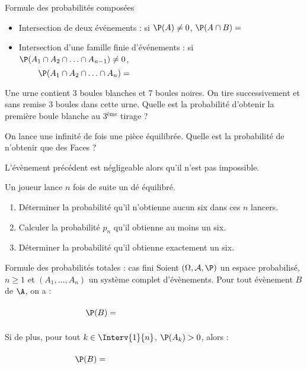 \documentclass[a4paper,10pt]{report}
\begin{document}
\begin{itemize}
\begin{Theoreme}{Formule des probabilités composées}
 \begin{itemize}
  \item Intersection de deux événements : si $\P(A) \ne 0$, $\P(A\cap B) = $
  \item Intersection d'une famille finie d'événements : si $\P(A_1 \cap A_2 \cap \ldots \cap A_{n-1}) \neq 0$,
   $$\P(A_1 \cap A_2 \cap \ldots \cap A_n)= \qquad \qquad \qquad \phantom{ahahaaaaaaaaaaaa bla bla bla}$$
 \end{itemize}
\end{Theoreme}

\begin{Exemple} Une urne contient 3 boules blanches et 7 boules noires. On tire successivement et sans remise 3 boules dans cette urne. Quelle est la probabilité d'obtenir la première boule blanche au 3$^{\text{ème}}$ tirage ?

\vspace{4cm}
\end{Exemple}


\begin{Exemple} On lance une infinité de fois une pièce équilibrée. Quelle est la probabilité de n'obtenir que des Faces ?

\vspace{5cm}
\end{Exemple}


\begin{Remarque}{} L'évènement précédent est négligeable alors qu'il n'est pas impossible.
\end{Remarque}

\begin{ApplicationDirecte} Un joueur lance $n$ fois de suite un dé équilibré.
 \begin{enumerate}
  \item Déterminer la probabilité qu'il n'obtienne aucun six dans ces $n$ lancers.
  \item Calculer la probabilité $p_n$ qu'il obtienne au moins un six.
  \item Déterminer la probabilité qu'il obtienne exactement un six.
 \end{enumerate}
 \end{ApplicationDirecte}
 
\begin{Theoreme}{Formule des probabilités totales : cas fini}
Soient $(\Omega, \mathcal{A}, \P)$ un espace probabilisé, $n \geq 1$ et $(A_1, \ldots, A_n)$ un système complet d'évènements. Pour tout évènement $B$ de $\A$, on a :
$$ \P(B) = \phantom{blabbbbbbbbbbb\sum_{k=1}^n P(A_k \cap B)}$$
Si de plus, pour tout $k \in \Interv{1}{n}$, $\P(A_k) >0$, alors :
$$\P(B) = \phantom{blabbbbbbbbbbb \sum_{k=1}^n P(A_k) \times P_{A_k}(B)} $$
\end{Theoreme}



\end{itemize}
\end{document}
